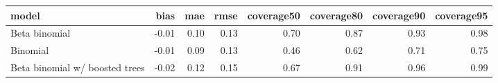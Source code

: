 \begin{table}[ht]
\centering
\begin{tabular}{lrrrrrrr}
  \hline
model & bias & mae & rmse & coverage50 & coverage80 & coverage90 & coverage95 \\ 
  \hline
Beta binomial & -0.01 & 0.10 & 0.13 & 0.70 & 0.87 & 0.93 & 0.98 \\ 
  Binomial & -0.01 & 0.09 & 0.13 & 0.46 & 0.62 & 0.71 & 0.75 \\ 
  Beta binomial w/ boosted trees & -0.02 & 0.12 & 0.15 & 0.67 & 0.91 & 0.96 & 0.99 \\ 
   \hline
\end{tabular}
\end{table}
